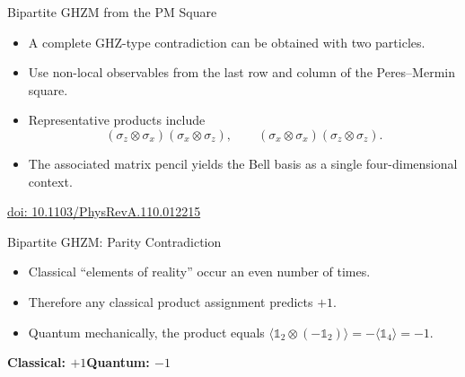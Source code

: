 \documentclass[xcolor=dvipsnames]{beamer}
\newenvironment{slideitems}{%
  \begin{itemize}\setlength{\itemsep}{0.55em}\setlength{\parskip}{0pt}%
}{\end{itemize}}
\begin{document}
\begin{frame}{Bipartite GHZM from the PM Square}
\begin{slideitems}
  \item A complete GHZ-type contradiction can be obtained with two particles.
  \item Use non-local observables from the last row and column of the
        Peres--Mermin square.
  \item Representative products include
        \[
          (\sigma_z\!\otimes\!\sigma_x)(\sigma_x\!\otimes\!\sigma_z),
          \qquad
          (\sigma_x\!\otimes\!\sigma_x)(\sigma_z\!\otimes\!\sigma_z).
        \]
  \item The associated matrix pencil yields the Bell basis as a single
        four-dimensional context.
\end{slideitems}
\centering
\href{https://doi.org/10.1103/PhysRevA.110.012215}{doi: 10.1103/PhysRevA.110.012215}
\end{frame}

\begin{frame}{Bipartite GHZM: Parity Contradiction}
\begin{slideitems}
  \item Classical ``elements of reality'' occur an even number of times.
  \item Therefore any classical product assignment predicts $+1$.
  \item Quantum mechanically, the product equals
$
\langle
\mathbb{1}_2 \otimes (-\mathbb{1}_2)
\rangle  =
-\langle
\mathbb{1}_4
 \rangle =
-1
 $.
\end{slideitems}

\vspace{5mm}
\centering
\Large
\textbf{Classical: $+1$}\qquad\textbf{Quantum: $-1$}
\end{frame}
\end{document}
